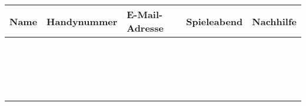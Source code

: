 \documentclass{article}
\begin{document}
\renewcommand{\arraystretch}{2}
\begin{table}[ht!]
  \begin{center}
    \begin{tabular}{|p{7cm}|p{7cm}|p{7cm}|c|c|} 
    	\toprule
      \textbf{Name} & \textbf{Handynummer} & \textbf{E-Mail-Adresse} & \textbf{Spieleabend} & \textbf{Nachhilfe} \\
      \midrule 
      & & & &    \\ \hline
      & & & &    \\ \hline
      & & & &    \\ \hline
      & & & &    \\ \hline
      & & & &    \\ \hline
      & & & &    \\ \hline
      & & & &    \\ \hline
      & & & &    \\ \hline
      & & & &    \\ \hline
      & & & &    \\ \hline
      & & & &    \\ \hline
      & & & &    \\ \hline
      & & & &    \\ \hline
      & & & &    \\ \hline
      & & & &    \\ \hline
      & & & &    \\ \hline
      & & & &    \\ \hline
      & & & &    \\
      \bottomrule
    \end{tabular}
  \end{center}
\end{table}
\end{document}
